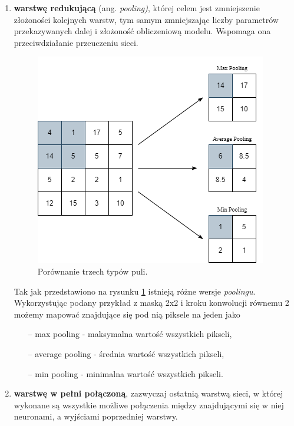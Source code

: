 \begin{enumerate}
    
    \item \textbf{warstwę redukującą} (ang. \textit{pooling)}, której celem jest zmniejszenie złożoności kolejnych warstw, tym samym zmniejszając liczby parametrów przekazywanych dalej i złożoność obliczeniową modelu. Wspomaga ona przeciwdziałanie przeuczeniu sieci.
        \begin{figure}[H]
            \centering
            \includegraphics[width=0.5\linewidth]{Obrazy/Rozdzial02/pooling.png}
            \caption{Porównanie trzech typów puli.}
            \label{fig:pooling}
        \end{figure}

        Tak jak przedstawiono na rysunku \ref{fig:pooling} istnieją różne wersje \textit{poolingu}. Wykorzystując podany przykład z maską 2x2 i kroku konwolucji równemu 2 możemy mapować znajdujące się pod nią piksele na jeden jako
        \begin{itemize}
            \item[--] max pooling -  maksymalna wartość wszystkich pikseli,
            \item[--] average pooling - średnia wartość wszystkich pikseli,
            \item[--] min pooling - minimalna wartość wszystkich pikseli.
        \end{itemize}
        
    \item \textbf{warstwę w pełni połączoną}, zazwyczaj ostatnią warstwą sieci, w której wykonane są wszystkie możliwe połączenia między znajdującymi się w niej neuronami, a wyjściami poprzedniej warstwy. 
\end{enumerate}



